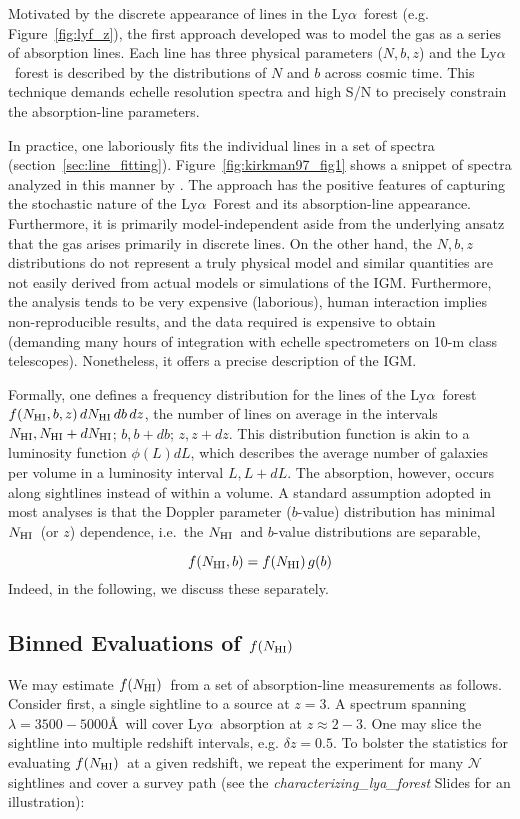 \documentclass[graybox]{svmult}
\def\lya{Ly$\alpha$}
\newcommand{\mnhi}{N_{\rm HI}}
\newcommand{\nhi}{$\mnhi$}
\def\mfnhi{f(\mnhi)}
\def\fnhi{$\mfnhi$}
\begin{document}
Motivated by the discrete appearance of lines in the 
\lya\ forest (e.g. Figure~\ref{fig:lyf_z}), the
first approach developed was to model the gas
as a series of absorption lines.  Each line has
three physical parameters ($N,b,z$) and 
the \lya\ forest is described by the distributions of
$N$ and $b$ across cosmic time.  This technique demands
echelle resolution spectra and high S/N to precisely 
constrain the absorption-line parameters.

In practice, one laboriously fits the individual lines in a set of
spectra (section~\ref{sec:line_fitting}).
Figure~\ref{fig:kirkman97_fig1} shows a snippet of spectra
analyzed in this manner by \cite{kt97}.  The approach has the
positive features of 
capturing the stochastic nature of the \lya\ Forest and
its absorption-line appearance.  Furthermore, it is 
primarily model-independent aside from the underlying
ansatz that the gas arises primarily in discrete lines.
On the other hand, the $N,b,z$ distributions do not
represent a truly physical model and similar quantities are not
easily derived from actual models or simulations of the IGM.
Furthermore, the analysis tends to 
be very expensive (laborious), 
human interaction implies non-reproducible results,
and the data required is expensive to obtain
(demanding many hours of integration with 
echelle spectrometers on 10-m class telescopes).
Nonetheless, it offers a precise description of the IGM.

Formally, one defines a frequency distribution for the
lines of the \lya\ forest
$f(\mnhi, b, z) \, d\mnhi \, db \, dz $, the number of lines on
average in the intervals $\mnhi, \mnhi+d\mnhi$; $b, b+db$; $z, z+dz$.
This distribution function is
akin to a luminosity function $\phi(L) dL$, which describes
the average number of galaxies per volume in a luminosity interval $L, L+dL$.
The absorption, however, occurs along 
sightlines instead of within a volume.  
A standard assumption adopted in most analyses is that
the Doppler parameter ($b$-value) distribution has 
minimal \nhi\ (or $z$) dependence, i.e.\ the \nhi\ and $b$-value
distributions are separable,

\begin{equation}
f(\mnhi,b) = \mfnhi \, g(b)
\end{equation}
Indeed, in the following, we discuss these separately.

\subsection{Binned Evaluations of \fnhi}
We may estimate \fnhi\ from a set of absorption-line 
measurements as follows. Consider first, a single sightline
to a source at $z=3$.  A spectrum spanning $\lambda = 3500-5000$\AA\
will cover \lya\ absorption at $z \approx 2-3$.
One may slice the sightline into multiple redshift intervals,
e.g. $\delta z = 0.5$.  To bolster the statistics
for evaluating \fnhi\ at a given redshift, we repeat the
experiment for many $\mathcal{N}$
sightlines and cover a survey path 
(see the {\it characterizing\_lya\_forest} Slides for
an illustration):
\end{document}
